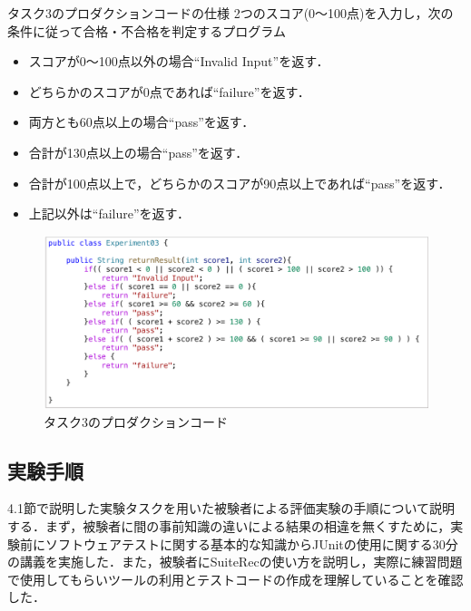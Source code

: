 \documentclass[12pt]{jarticle} %
\begin{document}
\begin{description}
\begin{itembox}[l]{タスク3のプロダクションコードの仕様}
2つのスコア(0～100点)を入力し，次の条件に従って合格・不合格を判定するプログラム
\begin{itemize}
\item スコアが0～100点以外の場合``Invalid Input''を返す．
\item どちらかのスコアが0点であれば``failure''を返す．
\item 両方とも60点以上の場合``pass''を返す．
\item 合計が130点以上の場合``pass''を返す．
\item 合計が100点以上で，どちらかのスコアが90点以上であれば``pass''を返す．
\item 上記以外は``failure''を返す．
\end{itemize}
\end{itembox}


\begin{figure}[htbp]
  \begin{center}
    \includegraphics[clip,width=15cm]{E3.pdf}
    \caption{タスク3のプロダクションコード}
    \label{E3}
  \end{center}
\end{figure}

\end{description}






\subsection{実験手順}

4.1節で説明した実験タスクを用いた被験者による評価実験の手順について説明する．まず，被験者に間の事前知識の違いによる結果の相違を無くすために，実験前にソフトウェアテストに関する基本的な知識からJUnitの使用に関する30分の講義を実施した．また，被験者に{\sf SuiteRec}の使い方を説明し，実際に練習問題で使用してもらいツールの利用とテストコードの作成を理解していることを確認した．
\end{document}
